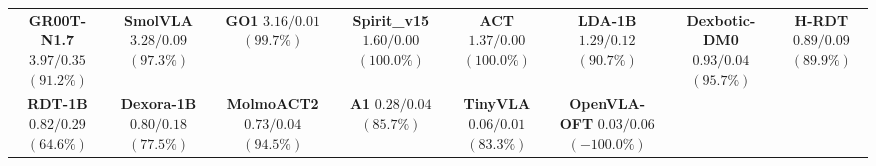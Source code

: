 \begin{table}[t]
{\begin{tabular}{cccccccc}
\addlinespace[3pt]

\makecell{\textbf{GR00T-N1.7}\\ $3.97 / 0.35$ {\scriptsize $(91.2\%)$}}
&
\makecell{\textbf{SmolVLA}\\ $3.28 / 0.09$ {\scriptsize $(97.3\%)$}}
&
\makecell{\textbf{GO1}\\ $3.16 / 0.01$ {\scriptsize $(99.7\%)$}}
&
\makecell{\textbf{Spirit\_v15}\\ $1.60 / 0.00$ {\scriptsize $(100.0\%)$}}
&
\makecell{\textbf{ACT}\\ $1.37 / 0.00$ {\scriptsize $(100.0\%)$}}
&
\makecell{\textbf{LDA-1B}\\ $1.29 / 0.12$ {\scriptsize $(90.7\%)$}}
&
\makecell{\textbf{Dexbotic-DM0}\\ $0.93 / 0.04$ {\scriptsize $(95.7\%)$}}
&
\makecell{\textbf{H-RDT}\\ $0.89 / 0.09$ {\scriptsize $(89.9\%)$}}
\\

\addlinespace[3pt]

\makecell{\textbf{RDT-1B}\\ $0.82 / 0.29$ {\scriptsize $(64.6\%)$}}
&
\makecell{\textbf{Dexora-1B}\\ $0.80 / 0.18$ {\scriptsize $(77.5\%)$}}
&
\makecell{\textbf{MolmoACT2}\\ $0.73 / 0.04$ {\scriptsize $(94.5\%)$}}
&
\makecell{\textbf{A1}\\ $0.28 / 0.04$ {\scriptsize $(85.7\%)$}}
&
\makecell{\textbf{TinyVLA}\\ $0.06 / 0.01$ {\scriptsize $(83.3\%)$}}
&
\makecell{\textbf{OpenVLA-OFT}\\ $0.03 / 0.06$ {\scriptsize $(-100.0\%)$}}
&
&
\\

\bottomrule
\end{tabular}
}
\end{table}

